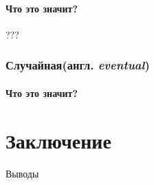 \documentclass[12pt,  openany]{book}
\begin{document}
\subsubsection{Что это значит?}
???
\subsection{Случайная(англ.  \textit{eventual})}
\subsubsection{Что это значит?}

\chapter{Заключение}
Выводы



\end{document}
